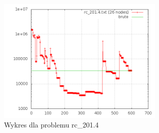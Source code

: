 \begin{frame}{}
    \begin{figure}
        \centering
        \includegraphics[width=8cm]{charts/rc_201_4.png}
        \caption{Wykres dla problemu rc\_201.4}
    \end{figure}
\end{frame}
